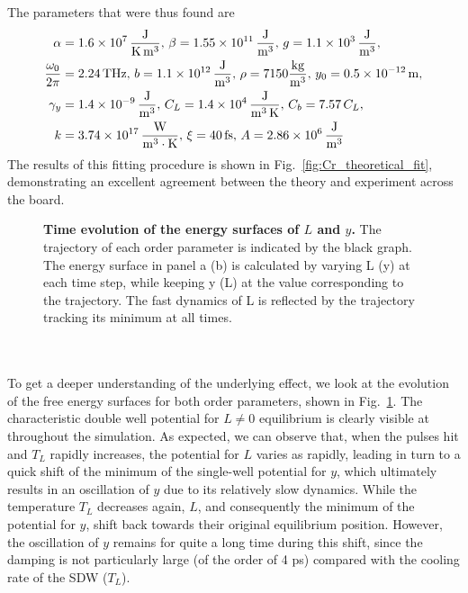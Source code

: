 The parameters that were thus found are
\begin{align}
	\alpha &= \SI{1.6e7} {\rm \frac{J}{K\, m^3}},\, \beta = \SI{1.55e11} {\rm \frac{J}{m^3}},\, g = \SI{1.1e3}{\rm \frac{J}{m^3}}, \\
	\frac{\omega_0}{2\pi} &= 2.24\, {\rm THz},\, b = \SI{1.1e12} {\rm \frac{J}{m^3}},\, \rho = 7150 {\rm \frac{kg}{m^3}},\, y_0 = \SI{0.5e-12} {\rm m},\\
	\gamma_y &= \SI{1.4e-9}{\rm \frac{J}{m^3}}, \, C_L = \SI{1.4e4}{\rm \frac{J}{m^3\,K}},\, C_b = 7.57\,C_L,\\
	k &= \SI{3.74e17} {\rm \frac{W}{m^3\cdot K}},\, \xi = 40\,{\rm fs},\,A = \SI{2.86e6}{\rm \frac{J}{m^3}}
\end{align}
The results of this fitting procedure is shown in Fig.~\ref{fig:Cr_theoretical_fit}, demonstrating an excellent agreement between the theory and experiment across the board.
\begin{figure}
	\centering
	\caption{\label{fig:Cr_energy_surfaces}{\bf Time evolution of the energy surfaces of $L$ and $y$.} The trajectory of each order parameter is indicated by the black graph. The energy surface in panel a (b) is calculated by varying L (y) at each time step, while keeping y (L) at the value corresponding to the trajectory. The fast dynamics of L is reflected by the trajectory tracking its minimum at all times.}
\end{figure}
\\\\
To get a deeper understanding of the underlying effect, we look at the evolution of the free energy surfaces for both order parameters, shown in Fig.~\ref{fig:Cr_energy_surfaces}.
The characteristic double well potential for $L\neq0$ equilibrium is clearly visible at throughout the simulation.
As expected, we can observe that, when the pulses hit and $T_L$ rapidly increases, the potential for $L$ varies as rapidly, leading in turn to a quick shift of the minimum of the single-well potential for $y$, which ultimately results in an oscillation of $y$ due to its relatively slow dynamics.
While the temperature $T_L$ decreases again, $L$, and consequently the minimum of the potential for $y$, shift back towards their original equilibrium position.
However, the oscillation of $y$ remains for quite a long time during this shift, since the damping is not particularly large (of the order of 4 ps) compared with the cooling rate of the SDW ($T_L$).
\\\\
